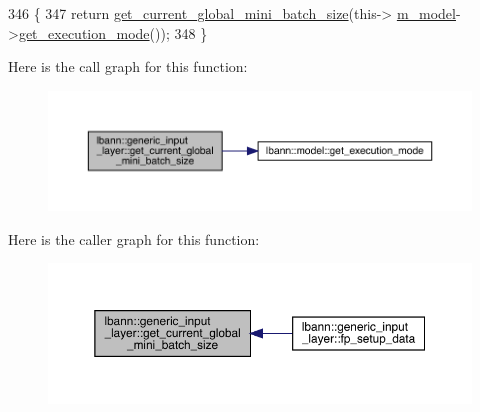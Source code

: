\begin{DoxyCode}
346                                                          \{
347     \textcolor{keywordflow}{return} \hyperlink{classlbann_1_1generic__input__layer_aaaa60fb7b94353fccaff25e6a862d833}{get\_current\_global\_mini\_batch\_size}(this->
      \hyperlink{classlbann_1_1Layer_a3d9315e99574166f2f33e37b572021d2}{m\_model}->\hyperlink{classlbann_1_1model_addb40597cf29aa6d31b6a7d09ef48608}{get\_execution\_mode}());
348   \}
\end{DoxyCode}
Here is the call graph for this function\+:\nopagebreak
\begin{figure}[H]
\begin{center}
\leavevmode
\includegraphics[width=350pt]{classlbann_1_1generic__input__layer_aaaa60fb7b94353fccaff25e6a862d833_cgraph}
\end{center}
\end{figure}
Here is the caller graph for this function\+:\nopagebreak
\begin{figure}[H]
\begin{center}
\leavevmode
\includegraphics[width=350pt]{classlbann_1_1generic__input__layer_aaaa60fb7b94353fccaff25e6a862d833_icgraph}
\end{center}
\end{figure}
\mbox{\label{classlbann_1_1generic__input__layer_aad7e5f1c51037a175c6bc9abaccdc7d6}} 
